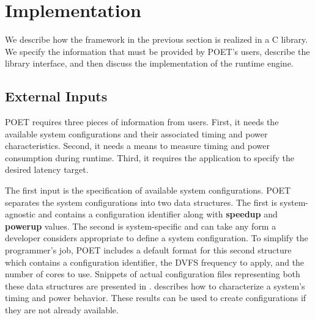 \section{Implementation}
\label{sec:poet-implementation}

We describe how the framework in the previous section is realized in a C library.
We specify the information that must be provided by POET's users, describe the library interface, and then discuss the implementation of the runtime engine.

\subsection{External Inputs}

POET requires three pieces of information from users.
First, it needs the available system configurations and their associated timing and power characteristics.
Second, it needs a means to measure timing and power consumption during runtime.
Third, it requires the application to specify the desired latency target.

The first input is the specification of available system configurations.
POET separates the system configurations into two data structures.
The first is system-agnostic and contains a configuration identifier along with \textbf{speedup} and \textbf{powerup} values.
The second is system-specific and can take any form a developer considers appropriate to define a system configuration.
To simplify the programmer's job, POET includes a default format for this second structure which contains a configuration identifier, the DVFS frequency to apply, and the number of cores to use.
Snippets of actual configuration files representing both these data structures are presented in .
 describes how to characterize a system's timing and power behavior.
These results can be used to create configurations if they are not already available.


